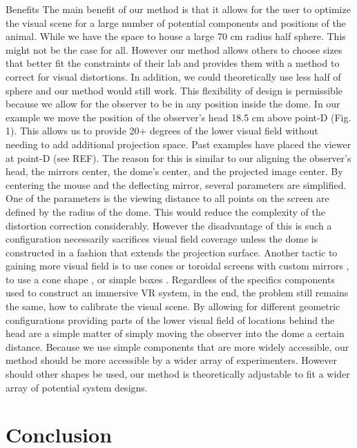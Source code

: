 \documentclass[10pt,letterpaper]{article}
\begin{document}
Benefits
The main benefit of our method is that it allows for the user to optimize the visual scene for a large number of potential components and positions of the animal. 
While we have the space to house a large 70 cm radius half sphere. This might not be the case for all. However our method allows others to choose sizes that better 
fit the constraints of their lab and provides them with a method to correct for visual distortions. In addition, we could theoretically use less half of sphere and our method 
would still work. This flexibility of design is permissible because we allow for the observer to be in any position inside the dome. In our example we move the position of the 
observer’s head 18.5 cm above point-D (Fig. 1). This allows us to provide 20+ degrees of the lower visual field without needing to add additional projection space. Past 
examples have placed the viewer at point-D (see REF). The reason for this is similar to our aligning the observer’s head, the mirrors center, the dome’s center, and the
 projected image center. By centering the mouse and the deflecting mirror, several parameters are simplified. One of the parameters is the viewing distance to all points on 
the screen are defined by the radius of the dome. This would reduce the complexity of the distortion correction considerably. However the disadvantage of this is such a 
configuration necessarily sacrifices visual field coverage unless the dome is constructed in a fashion that extends the projection surface. Another tactic to gaining 
more visual field is to use cones or toroidal screens with custom mirrors \cite{holscher2005rats, harvey2009intracellular}, to use a cone shape \cite{aronov2014engagement}, 
or simple boxes \cite{aghajan2015impaired}. Regardless of the specifics components used to construct an 
immersive VR system, in the end, the problem still remains the same, how to calibrate the visual scene. By allowing for different geometric configurations providing parts of 
the lower visual field of locations behind the head are a simple matter of simply moving the observer into the dome a certain distance. Because we use simple components that 
are more widely accessible, our method should be more accessible by a wider array of experimenters. However should other shapes be used, our method is theoretically 
adjustable to fit a wider array of potential system designs.

\section*{Conclusion}
\end{document}
